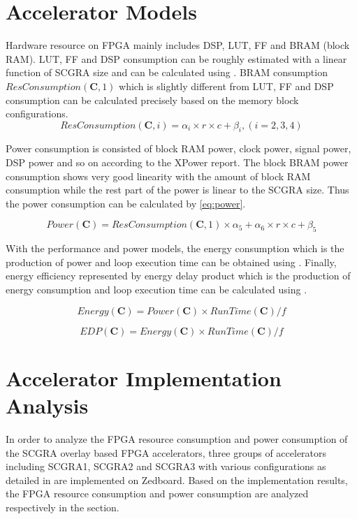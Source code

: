 \appendix
\chapter{Accelerator Models}
Hardware resource on FPGA mainly includes DSP, LUT, FF and BRAM (block RAM). LUT, FF and DSP consumption can be roughly estimated with a linear function of SCGRA size and can be calculated using . BRAM consumption $ResConsumption(\bm{C}, 1)$ which is slightly different from LUT, FF and DSP consumption can be calculated precisely based on the memory block configurations. 
\begin{equation} \label{eq:dsplutff}
    ResConsumption(\bm{C}, i)=\alpha_i \times r \times c + \beta_i, (i=2,3,4)
\end{equation}

Power consumption is consisted of block RAM power, clock power, signal power, DSP power and so on according to the XPower report. The block BRAM power consumption shows very good linearity with the amount of block RAM consumption while the rest part of the power is linear to the SCGRA size. Thus the power consumption can be calculated by \eqref{eq:power}. 

\begin{equation}\label{eq:power}
Power(\bm{C}) = ResConsumption(\bm{C}, 1) \times \alpha_5 + \alpha_6 \times r \times c + \beta_5
\end{equation}

With the performance and power models, the energy consumption which is the production of power and loop execution time can be obtained using . Finally, energy efficiency represented by energy delay product which is the production of energy consumption and loop execution time can be calculated using .

\begin{equation} \label{eq:energy}
Energy(\bm{C}) = Power(\bm{C}) \times RunTime(\bm{C}) / f
\end{equation}

\begin{equation} \label{eq:edp}
EDP(\bm{C}) = Energy(\bm{C}) \times RunTime(\bm{C}) / f
\end{equation}

\chapter{Accelerator Implementation Analysis}
In order to analyze the FPGA resource consumption and power consumption of the SCGRA overlay based FPGA accelerators, three groups of accelerators including SCGRA1, SCGRA2 and SCGRA3 with various configurations as detailed in  are implemented on Zedboard. Based on the implementation results, the FPGA resource consumption and power consumption are analyzed respectively in the section.

